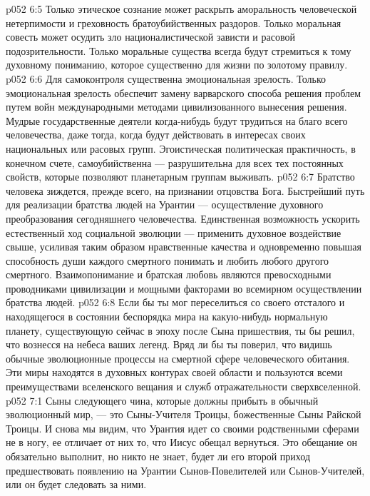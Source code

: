 \vs p052 6:5 \pc {}\bibnobreakspace {} Только этическое сознание может раскрыть аморальность человеческой нетерпимости и греховность братоубийственных раздоров. Только моральная совесть может осудить зло националистической зависти и расовой подозрительности. Только моральные существа всегда будут стремиться к тому духовному пониманию, которое существенно для жизни по золотому правилу.
\vs p052 6:6 \pc {}\bibnobreakspace {} Для самоконтроля существенна эмоциональная зрелость. Только эмоциональная зрелость обеспечит замену варварского способа решения проблем путем войн международными методами цивилизованного вынесения решения. Мудрые государственные деятели когда\hyp{}нибудь будут трудиться на благо всего человечества, даже тогда, когда будут действовать в интересах своих национальных или расовых групп. Эгоистическая политическая практичность, в конечном счете, самоубийственна --- разрушительна для всех тех постоянных свойств, которые позволяют планетарным группам выживать.
\vs p052 6:7 \pc {}\bibnobreakspace {} Братство человека зиждется, прежде всего, на признании отцовства Бога. Быстрейший путь для реализации братства людей на Урантии --- осуществление духовного преобразования сегодняшнего человечества. Единственная возможность ускорить естественный ход социальной эволюции --- применить духовное воздействие свыше, усиливая таким образом нравственные качества и одновременно повышая способность души каждого смертного понимать и любить любого другого смертного. Взаимопонимание и братская любовь являются превосходными проводниками цивилизации и мощными факторами во всемирном осуществлении братства людей.
\vs p052 6:8 \pc Если бы ты мог переселиться со своего отсталого и находящегося в состоянии беспорядка мира на какую\hyp{}нибудь нормальную планету, существующую сейчас в эпоху после Сына пришествия, ты бы решил, что вознесся на небеса ваших легенд. Вряд ли бы ты поверил, что видишь обычные эволюционные процессы на смертной сфере человеческого обитания. Эти миры находятся в духовных контурах своей области и пользуются всеми преимуществами вселенского вещания и служб отражательности сверхвселенной.
\vs p052 7:1 Сыны следующего чина, которые должны прибыть в обычный эволюционный мир, --- это Сыны\hyp{}Учителя Троицы, божественные Сыны Райской Троицы. И снова мы видим, что Урантия идет со своими родственными сферами не в ногу, ее отличает от них то, что Иисус обещал вернуться. Это обещание он обязательно выполнит, но никто не знает, будет ли его второй приход предшествовать появлению на Урантии Сынов\hyp{}Повелителей или Сынов\hyp{}Учителей, или он будет следовать за ними.
